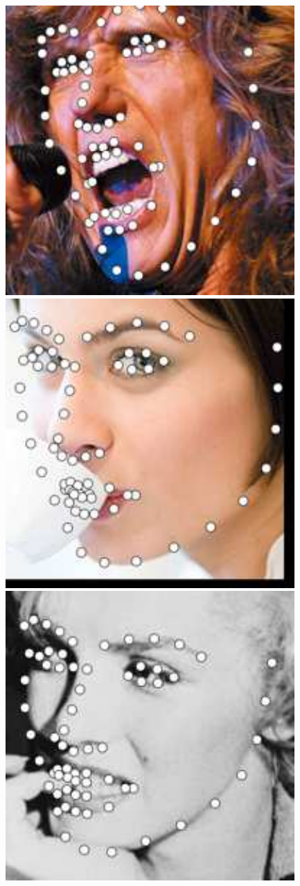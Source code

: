 \documentclass[journal]{IEEEtran}
\begin{document}
\begin{figure}[!htb]
\includegraphics[scale=0.22]{68_MCNet_image_086_1}
\includegraphics[scale=0.22]{68_MCNet_image_097_1}
\includegraphics[scale=0.22]{68_MCNet_image_017_1}


\end{figure}
\end{document}
